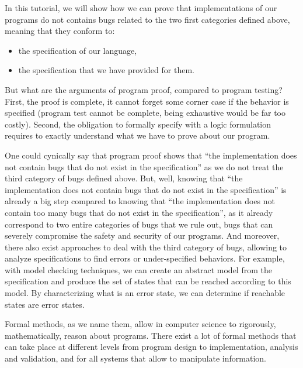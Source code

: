 In this tutorial, we will show how we can prove that implementations
of our programs do not contains bugs related to the two first categories
defined above, meaning that they conform to:

\begin{itemize}
\item the specification of our language,
\item the specification that we have provided for them.
\end{itemize}


But what are the arguments of program
proof, compared to program testing? First, the proof is complete, it
cannot forget some corner case if the behavior is specified (program
test cannot be complete, being exhaustive would be far too costly).
Second, the obligation to formally specify with a logic formulation
requires to exactly understand what we have to prove about our program.



One could cynically say that program proof shows that ``the
implementation does not contain bugs that do not exist in the
specification'' as we do not treat the third category of bugs defined
above. But, well, knowing that ``the implementation does not contain bugs
that do not exist in the specification'' is already a big step compared to
knowing that ``the implementation does not contain too many bugs that do
not exist in the specification'', as it already correspond to two entire
categories of bugs that we rule out, bugs that can severely compromise the
safety and security of our programs. And moreover, there also exist approaches
to deal with the third category of bugs, allowing to analyze specifications
to find errors or under-specified behaviors. For
example, with model checking techniques, we can create an abstract model
from the specification and produce the set of states that can be reached
according to this model. By characterizing what is an error state, we
can determine if reachable states are error states.





Formal methods, as we name them, allow in computer science to
rigorously, mathematically, reason about programs. There exist a lot of
formal methods that can take place at different levels from program
design to implementation, analysis and validation, and for all systems
that allow to manipulate information.



